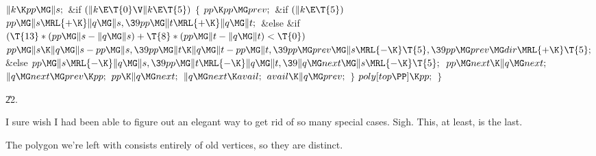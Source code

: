 ${}\|k\K\\{pp}\MG\|s;{}$\6
\&{if} ${}(\|k\E\T{0}\V\|k\E\T{5}){}$\5
${}\{{}$\1\6
${}\\{pp}\K\\{pp}\MG\\{prev};{}$\6
\&{if} ${}(\|k\E\T{5}){}$\1\5
${}\\{pp}\MG\|s\MRL{+{\K}}\|q\MG\|s,\39\\{pp}\MG\|t\MRL{+{\K}}\|q\MG\|t;{}$\2\6
\&{else} \&{if} ${}(\T{13}*(\\{pp}\MG\|s-\|q\MG\|s)+\T{8}*(\\{pp}\MG\|t-\|q\MG%
\|t)<\T{0}){}$\1\5
${}\\{pp}\MG\|s\K\|q\MG\|s-\\{pp}\MG\|s,\39\\{pp}\MG\|t\K\|q\MG\|t-\\{pp}\MG%
\|t,\39\\{pp}\MG\\{prev}\MG\|s\MRL{-{\K}}\T{5},\39\\{pp}\MG\\{prev}\MG\\{dir}%
\MRL{+{\K}}\T{5};{}$\2\6
\&{else}\1\5
${}\\{pp}\MG\|s\MRL{-{\K}}\|q\MG\|s,\39\\{pp}\MG\|t\MRL{-{\K}}\|q\MG\|t,\39\|q%
\MG\\{next}\MG\|s\MRL{-{\K}}\T{5};{}$\2\6
${}\\{pp}\MG\\{next}\K\|q\MG\\{next};{}$\6
${}\|q\MG\\{next}\MG\\{prev}\K\\{pp};{}$\6
${}\\{pp}\K\|q\MG\\{next};{}$\6
${}\|q\MG\\{next}\K\\{avail};{}$\6
${}\\{avail}\K\|q\MG\\{prev};{}$\6
\4${}\}{}$\2\6
${}\\{poly}[\\{top}\PP]\K\\{pp};{}$\6
\4${}\}{}$\2\par
\U22.\fi

I sure wish I had been able to figure out an elegant way
to get rid of
so many special cases. Sigh. This, at least, is the last.

The polygon we're left with consists entirely of old vertices, so they
are distinct.

